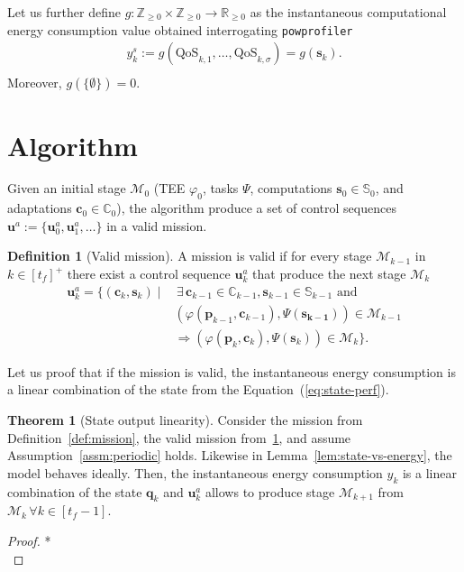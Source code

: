 \documentclass[letterpaper,10pt,conference]{ieeeconf}
\newcommand{\stt}[1]{{\small\tt #1}} %
\newcommand{\powprof}{\stt{powprofiler}}
\theoremstyle{definition}
\newtheorem{thm}{Theorem}[section]
\newtheorem{defn}{Definition}[section]
\begin{document}
Let us further define $g:\mathbb{Z}_{\geq 0}\times\mathbb{Z}_{\geq 0}\rightarrow\mathbb{R}_{\geq 0}$ as the instantaneous computational energy consumption value obtained interrogating \powprof{}
\begin{equation}\label{eq:energy-comp}\begin{split}
  y_k^s:=g\left(\text{QoS}_{k,1},\dots,\text{QoS}_{k,\sigma}\right)=g\left(\mathbf{s}_{k}\right).\\
\end{split}\end{equation}
Moreover, $g(\{\emptyset\})=0$.

\section{Algorithm}
\label{sec:algo}

Given an initial stage $\mathcal{M}_0$ (TEE $\varphi_0$, tasks $\Psi$, computations $\mathbf{s}_0\in\mathbb{S}_0$, and adaptations $\mathbf{c}_0\in\mathbb{C}_0$), the algorithm produce a set of control sequences $\mathbf{u}^a:=\{\mathbf{u}_0^a,\mathbf{u}_1^a,\dots\}$ in a valid mission.

\begin{defn}[Valid mission]\label{def:valid}
  A mission is valid if for every stage $\mathcal{M}_{k-1}$ in $k\in[t_f]^+$ there exist a control sequence $\mathbf{u}_k^{a}$ that produce the next stage $\mathcal{M}_k$
  \begin{equation}\begin{split}
    \mathbf{u}^a_{k}=\{(\mathbf{c}_{k},\mathbf{s}_{k})\mid& \,\exists\,\mathbf{c}_{k-1}\in\mathbb{C}_{k-1}, \mathbf{s}_{k-1}\in\mathbb{S}_{k-1}\text{ and}\\
    &(\varphi(\mathbf{p}_{k-1},\mathbf{c}_{k-1}),\Psi(\mathbf{s_{k-1}}))\in\mathcal{M}_{k-1}\\
    &\Longrightarrow(\varphi(\mathbf{p}_{k},\mathbf{c}_{k}),\Psi(\mathbf{s}_{k}))\in\mathcal{M}_{k}\}.
  \end{split}\end{equation}
\end{defn}

Let us proof that if the mission is valid, the instantaneous energy consumption is a linear combination of the state from the Equation~(\ref{eq:state-perf}).

\begin{thm}[State output linearity]\label{thm:state-vs-energy}
  Consider the mission from Definition~\ref{def:mission}, the valid mission from~\ref{def:valid}, and assume Assumption~\ref{assm:periodic} holds. Likewise in Lemma~\ref{lem:state-vs-energy}, the model behaves ideally. 
  Then, the instantaneous energy consumption $y_k$ is a linear combination of the state $\mathbf{q}_k$ and $\mathbf{u}_k^a$ allows to produce stage $\mathcal{M}_{k+1}$ from $\mathcal{M}_k\,\forall k\in[t_f-1]$.
\end{thm}
\begin{proof}
  *\\
\end{proof}
\end{document}
